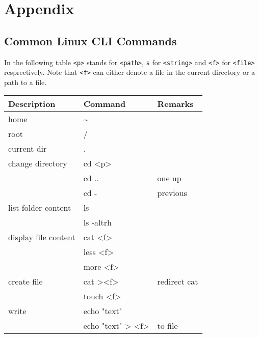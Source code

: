 \section{Appendix}
\subsection{Common Linux CLI Commands}
In the following table \texttt{<p>} stands for \texttt{<path>}, \texttt{s} for \texttt{<string>} and \texttt{<f>} for \texttt{<file>} resprectively. Note that \texttt{<f>} can either denote a file in the current directory or a path to a file.\\
{\small %
\begin{tabularx}{\linewidth}{@{} l>{\ttfamily}lX @{}}
    \toprule
    Description          & \normalfont Command        & Remarks         \\
    \midrule
    home                 & \textasciitilde{}          &                 \\
    root                 & /                          &                 \\
    current dir          & .                          &                 \\
    change directory     & cd <p>                     &                 \\
                         & cd ..                      & one up          \\
                         & cd -                       & previous        \\
    list folder content  & ls                         &                 \\
                         & ls -altrh                  &                 \\
    display file content & cat <f>                    &                 \\
                         & less <f>                   &                 \\
                         & more <f>                   &                 \\
    create file          & cat ><f>                   & redirect cat    \\
                         & touch <f>                  &                 \\
    write                & echo "text"                &                 \\
                         & echo "text" > <f>          & to file         \\

\end{tabularx}}
